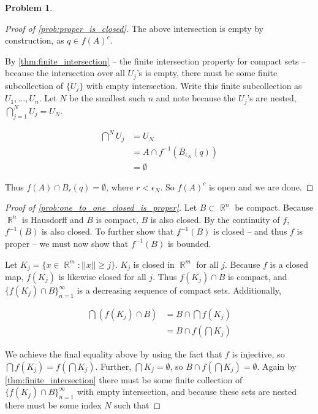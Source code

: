 \documentclass[english]{article}
\DeclareMathOperator{\R}{\mathbb{R}}
\DeclareMathOperator{\<}{\langle}
\renewcommand{\>}{\rangle}
\newcommand{\inv}[1]{#1^{-1}}
\theoremstyle{definition}
\newtheorem{problem}[theorem]{Problem}
\begin{document}
\begin{problem}
\begin{proof}[Proof of \cref{prob:proper_is_closed}]
            The above intersection is empty by construction, as $q \in f(A)^c$.
            
            By \cref{thm:finite_intersection} -- the finite intersection property for compact sets -- because the intersection over all $U_j$'s is empty, there must be some finite subcollection of $\{U_j\}$ with empty intersection. Write this finite subcollection as $U_1, \dots, U_n$. Let $N$  be the smallest such $n$ and note because the $U_j$'s are nested, $\bigcap^N_{j=1} U_j = U_N$. 

            \begin{align*}
                \bigcap^N U_j
                & = U_N \\
                & = A \cap \inv{f}\left( \overline{B}_{\epsilon_N}(q) \right) \\
                & = \emptyset
            \end{align*}

            Thus $f(A) \cap B_{r}(q) = \emptyset$, where $r < \epsilon_N$. So $f(A)^c$ is open and we are done. 
    \end{proof}
    
    \begin{proof}[Proof of \cref{prob:one_to_one_closed_is_proper}]
        Let $B \subset \R^n$ be compact. Because $\R^n$ is Hausdorff and $B$ is compact, $B$ is also closed. By the continuity of $f$, $\inv{f}(B)$ is also closed. To further show that $\inv{f}(B)$ is closed -- and thus $f$ is proper -- we must now show that $\inv{f}(B)$ is bounded. 

        Let $K_j = \{x \in \R^m : ||x|| \geq j\}$. $K_j$ is closed in $\R^m$ for all $j$. Because $f$ is a closed map, $f(K_j)$ is likewise closed for all $j$. Thus $f(K_j) \cap B$ is compact, and $\{f(K_j) \cap B\}_{n = 1}^{\infty}$ is a decreasing sequence of compact sets. Additionally, 

        \begin{align*}
            \bigcap \left( f(K_j) \cap B \right)  
            & = B \cap \bigcap f(K_j) \\
            & = B \cap f\left( \bigcap K_j \right)
        \end{align*}

        We achieve the final equality above by using the fact that $f$ is injective, so $\bigcap f(K_j) = f\left( \bigcap K_j \right)$. Further, $\bigcap K_j = \emptyset$, so $B \cap f\left( \bigcap K_j \right) = \emptyset$. Again by \cref{thm:finite_intersection} there must be some finite collection of $\{f(K_j) \cap B\}_{n = 1}^{\infty}$ with empty intersection, and because these sets are nested there must be some index $N$ such that 


\end{proof}
\end{problem}
\end{document}
